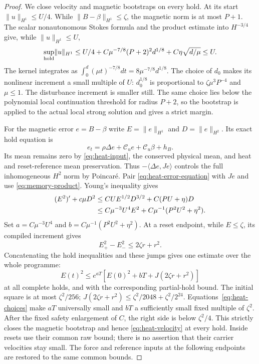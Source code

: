 \documentclass[11pt,a4paper]{amsart}
\theoremstyle{definition}
\theoremstyle{remark}
\numberwithin{equation}{section}
\newcommand{\Ccal}{\mathcal C}
\newcommand{\ip}[2]{\langle #1,#2\rangle}
\newcommand{\norm}[1]{\lVert #1\rVert}
\begin{document}
\begin{proof}
We close velocity and magnetic bootstraps on every hold.  At its start
$\norm u_{H^1}\le U/4$.  While
$\norm{B-\beta}_{H^1}\le\zeta$, the magnetic norm is at most $P+1$.
The scalar nonautonomous Stokes formula and the product estimate into
$H^{-3/4}$ give, while $\norm u_{H^1}\le U$,
\begin{equation}\label{eq:heat-velocity}
 \sup_{\rm hold}\norm u_{H^1}
 \le U/4+C\mu^{-7/8}(P+2)^2d^{1/8}
                          +C\eta\sqrt{d/\mu}\le U.
\end{equation}
The kernel integrates as $\int_0^d(\mu t)^{-7/8}dt
=8\mu^{-7/8}d^{1/8}$.  The choice of $d_0$ makes its nonlinear
increment a small multiple of $U$: $d_0^{1/8}$ is proportional to
$\zeta\mu^3P^{-4}$ and $\mu\le1$.  The disturbance increment is
smaller still.  The same choice lies below the polynomial local
continuation threshold for radius $P+2$, so the bootstrap is applied
to the actual local strong solution and gives a strict margin.

For the magnetic error $e=B-\beta$ write
$E=\norm e_{H^1}$ and $D=\norm e_{H^2}$.  Its exact hold equation is
\begin{equation}\label{eq:heat-error-equation}
 e_t=\rho\Delta e+\Ccal_ue+\Ccal_u\beta+h_B.
\end{equation}
Its mean remains zero by \eqref{eq:heat-input}, the conserved physical
mean, and heat and reset-reference mean preservation.  Thus
$-\ip{\Delta e}{Je}$ controls the full inhomogeneous $H^2$ norm by
Poincar\'e.  Pair \eqref{eq:heat-error-equation} with $Je$ and use
\eqref{eq:memory-product}.  Young's inequality gives
\begin{align}\label{eq:heat-global-differential}
 (E^2)'+c\mu D^2
 &\le CU E^{1/2}D^{3/2}+C(PU+\eta)D\notag\\
 &\le C\mu^{-3}U^4E^2+C\mu^{-1}(P^2U^2+\eta^2).
\end{align}
Set $a=C\mu^{-3}U^4$ and $b=C\mu^{-1}(P^2U^2+\eta^2)$.
At a reset endpoint, while $E\le\zeta$, its compiled increment gives
\begin{equation}\label{eq:heat-reset-jump}
 E_+^2-E_-^2\le2\zeta r+r^2.
\end{equation}
Concatenating the hold inequalities and these jumps gives one estimate
over the whole programme:
\begin{equation}\label{eq:heat-global}
 E(t)^2\le e^{aT}
 \left[E(0)^2+bT+J(2\zeta r+r^2)\right]
\end{equation}
at all complete holds, and with the corresponding partial-hold bound.
The initial square is at most $\zeta^2/256$;
$J(2\zeta r+r^2)\le\zeta^2/2048+\zeta^2/2^{24}$.
Equations~\eqref{eq:heat-choices} make $aT$ universally small and
$bT$ a sufficiently small fixed multiple of $\zeta^2$.
After the fixed safety enlargement of $C$, the right side is below
$\zeta^2/4$.  This strictly closes the magnetic bootstrap and hence
\eqref{eq:heat-velocity} at every hold.  Inside resets use their common
raw bound; there is no assertion that their carrier velocities stay small.
The force and reference inputs at the following endpoints are restored
to the same common bounds.


\end{proof}
\end{document}
